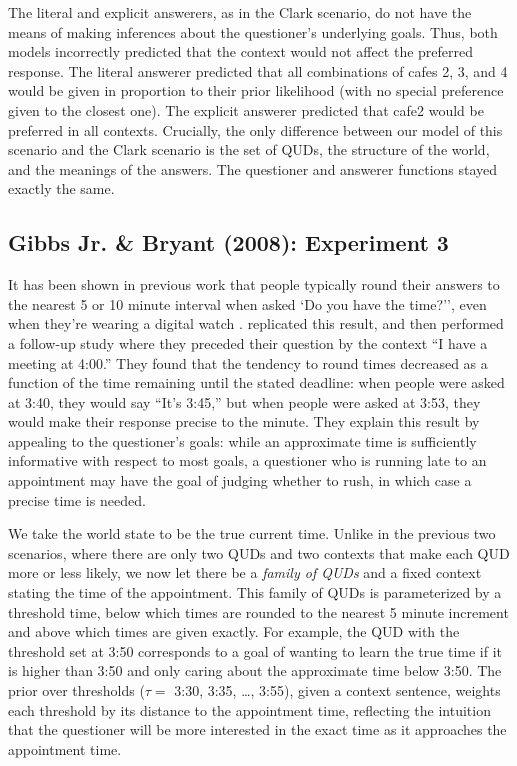 \documentclass[12pt, floatsintext, jou]{apa6}
\begin{document}
The literal and explicit answerers, as in the Clark scenario, do not have the means of making inferences about the questioner's underlying goals. Thus, both models incorrectly predicted that the context would not affect the preferred response. The literal answerer predicted that all combinations of cafes 2, 3, and 4 would be given in proportion to their prior likelihood (with no special preference given to the closest one). The explicit answerer predicted that cafe2 would be preferred in all contexts.     Crucially, the only difference between our model of this scenario and the Clark scenario is the set of QUDs, the structure of the world, and the meanings of the answers. The questioner and answerer functions stayed exactly the same.

\subsection{Gibbs Jr. \& Bryant (2008): Experiment 3}

It has been shown in previous work that people typically round their answers to the nearest 5 or 10 minute interval when asked `Do you have the time?'', even when they're wearing a digital watch \cite{DerHenstCarlesSperber02_RelevanceTellingTime}.   replicated this result, and then performed a follow-up study where they preceded their question by the context ``I have a meeting at 4:00.'' They found that the tendency to round times decreased as a function of the time remaining until the stated deadline: when people were asked at 3:40, they would say ``It's 3:45,'' but when people were asked at 3:53, they would make their response precise to the minute. They explain this result by appealing to the questioner's goals: while an approximate time is sufficiently informative with respect to most goals, a questioner who is running late to an appointment may have the goal of judging whether to rush, in which case a precise time is needed. 

We take the world state to be the true current time. Unlike in the previous two scenarios, where there are only two QUDs  and two contexts that make each QUD more or less likely, we now let there be a \emph{family of QUDs} and a fixed context stating the time of the appointment. This family of QUDs is parameterized by a threshold time, below which times are rounded to the nearest 5 minute increment and above which times are given exactly. For example, the QUD with the threshold set at 3:50 corresponds to a goal of wanting to learn the true time if it is higher than 3:50 and only caring about the approximate time below 3:50. The prior over thresholds ($\tau =$ 3:30, 3:35, \dots, 3:55), given a context sentence, weights each threshold by its distance to the appointment time, reflecting the intuition that the questioner will be more interested in the exact time as it approaches the appointment time.
\end{document}
